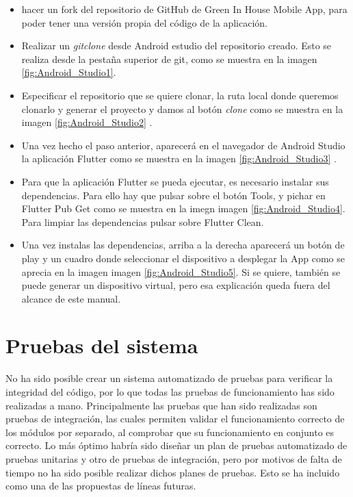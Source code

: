     \begin{itemize}
        \item hacer un fork del repositorio de GitHub de Green In House Mobile App, para poder tener una versión propia del código de la aplicación. 
        \item Realizar un \textit{gitclone} desde Android estudio del repositorio creado. Esto se realiza desde la pestaña superior de git, como se muestra en la imagen \ref{fig:Android_Studio1}.
        \item Especificar el repositorio que se quiere clonar, la ruta local donde queremos clonarlo y generar el proyecto y damos al botón \textit{clone} como se muestra en la imagen \ref{fig:Android_Studio2} .
        \item Una vez hecho el paso anterior, aparecerá en el navegador de Android Studio la aplicación Flutter como se muestra en la imagen \ref{fig:Android_Studio3} .
        \item Para que la aplicación Flutter se pueda ejecutar, es necesario instalar sus dependencias. Para ello hay que pulsar sobre el botón Tools, y pichar en Flutter Pub Get como se muestra en la imegn imagen \ref{fig:Android_Studio4}. Para limpiar las dependencias pulsar sobre Flutter Clean.
        \item Una vez instalas las dependencias, arriba a la derecha aparecerá un botón de play y un cuadro donde seleccionar el dispositivo a desplegar la App como se aprecia en la imagen imagen \ref{fig:Android_Studio5}. Si se quiere, también se puede generar un dispositivo virtual, pero esa explicación queda fuera del alcance de este manual.
    \end{itemize}

        
\section{Pruebas del sistema}

No ha sido posible crear un sistema automatizado de pruebas para verificar la integridad del código, por lo que todas las pruebas de funcionamiento has sido realizadas a mano. Principalmente las pruebas que han sido realizadas son pruebas de integración, las cuales permiten validar el funcionamiento correcto de los módulos por separado, al comprobar que su funcionamiento en conjunto es correcto. Lo más óptimo habría sido diseñar un plan de pruebas automatizado de pruebas unitarias y otro de pruebas de integración, pero por motivos de falta de tiempo no ha sido posible realizar dichos planes de pruebas. Esto se ha incluido como una de las propuestas de líneas futuras.


